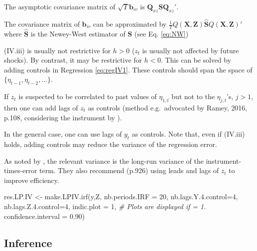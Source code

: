 \documentclass[
  12pt,
]{book}
\newenvironment{Shaded}{\begin{snugshade}}{\end{snugshade}}
\newcommand{\AttributeTok}[1]{\textcolor[rgb]{0.77,0.63,0.00}{#1}}
\newcommand{\CommentTok}[1]{\textcolor[rgb]{0.56,0.35,0.01}{\textit{#1}}}
\newcommand{\DecValTok}[1]{\textcolor[rgb]{0.00,0.00,0.81}{#1}}
\newcommand{\FloatTok}[1]{\textcolor[rgb]{0.00,0.00,0.81}{#1}}
\newcommand{\FunctionTok}[1]{\textcolor[rgb]{0.00,0.00,0.00}{#1}}
\newcommand{\NormalTok}[1]{#1}
\newcommand{\OtherTok}[1]{\textcolor[rgb]{0.56,0.35,0.01}{#1}}
\theoremstyle{definition}
\theoremstyle{definition}
\theoremstyle{definition}
\theoremstyle{definition}
\theoremstyle{remark}
\begin{document}
The asymptotic covariance matrix of \(\sqrt{T}\mathbf{b}_{iv}\) is \(\mathbf{Q}_{xz} \mathbf{S} \mathbf{Q}_{xz}'\).

The covariance matrix of \(\mathbf{b}_{iv}\) can be approximated by \(\frac{1}{T}Q(\mathbf{X},\mathbf{Z})\hat{\mathbf{S}}Q(\mathbf{X},\mathbf{Z})'\) where \(\hat{\mathbf{S}}\) is the Newey-West estimator of \(\mathbf{S}\) (see Eq. \eqref{eq:NW})

(IV.iii) is usually not restrictive for \(h>0\) (\(z_t\) is usually not affected by future shocks). By contrast, it may be restrictive for \(h<0\). This can be solved by adding controls in Regression \eqref{eq:regIV1}. These controls should span the space of \(\{\eta_{t-1},\eta_{t-2},\dots\}\).

If \(z_t\) is suspected to be correlated to past values of \(\eta_{1,t}\) but not to the \(\eta_{j,t}\)'s, \(j>1\), then one can add lags of \(z_t\) as controls (method e.g.~advocated by Ramey, 2016, p.108, considering the instrument by \citet{Gertler_Karadi_2015}).

In the general case, one can use lags of \(y_t\) as controls. Note that, even if (IV.iii) holds, adding controls may reduce the variance of the regression error.

As noted by \citet{Stock_Watson_2018}, the relevant variance is the long-run variance of the instrument-times-error term. They also recommend (p.926) using leads and lags of \(z_t\) to improve efficiency.

\begin{Shaded}
\begin{Highlighting}[]
\NormalTok{res.LP.IV }\OtherTok{\textless{}{-}} \FunctionTok{make.LPIV.irf}\NormalTok{(y,Z,}
                           \AttributeTok{nb.periods.IRF =} \DecValTok{20}\NormalTok{,}
                           \AttributeTok{nb.lags.Y.4.control=}\DecValTok{4}\NormalTok{,}
                           \AttributeTok{nb.lags.Z.4.control=}\DecValTok{4}\NormalTok{,}
                           \AttributeTok{indic.plot =} \DecValTok{1}\NormalTok{, }\CommentTok{\# Plots are displayed if = 1.}
                           \AttributeTok{confidence.interval =} \FloatTok{0.90}\NormalTok{)}
\end{Highlighting}
\end{Shaded}

\hypertarget{Inference}{%
\subsection{Inference}\label{Inference}}
\end{document}
